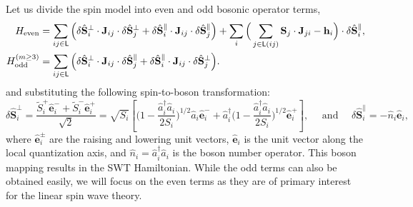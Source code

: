Let us divide the spin model into even and odd bosonic operator terms,
\begin{subequations}\label{eq: LSWT boson expansion even/odd}
    \begin{align}
        H_{\rm even} &= \sum_{ij\in\mathsf{L}} 
        \Big( \delta \hat{\mathbf{S}}_{i}^{\perp} \cdot \mathbf{J}_{ij} \cdot \delta \hat{\mathbf{S}}_{j}^{\perp} 
        + \delta \hat{\mathbf{S}}_{i}^{\parallel} \cdot \mathbf{J}_{ij} \cdot \delta \hat{\mathbf{S}}_{j}^{\parallel} \Big)
        + \sum_{i} \Big( \sum_{j \in \mathsf{L}(ij)} \mathbf{S}_{j} \cdot \mathbf{J}_{ji} - \mathbf{h}_{i} \Big) \cdot \delta \hat{\mathbf{S}}_{i}^{\parallel}, 
        \label{subeq: even bosonic terms in SWT} \\
        H_{\rm odd}^{(m \ge 3)} &= \sum_{ij\in\mathsf{L}} 
        \Big( \delta \hat{\mathbf{S}}_{i}^{\perp} \cdot \mathbf{J}_{ij} \cdot \delta \hat{\mathbf{S}}_{j}^{\parallel} 
        + \delta \hat{\mathbf{S}}_{i}^{\parallel} \cdot \mathbf{J}_{ij} \cdot \delta \hat{\mathbf{S}}_{j}^{\perp} \Big).
        \label{subeq: odd bosonic terms in SWT} 
    \end{align}
\end{subequations}
and substituting the following spin-to-boson transformation:
\begin{equation}
    \delta \hat{\mathbf{S}}_{i}^{\perp} = \frac{\widetilde{S}_{i}^{+} \hat{\mathbf{e}}^{-}_{i} + \widetilde{S}_{i}^{-} \hat{\mathbf{e}}^{+}_{i} }{\sqrt{2}} = \sqrt{S_{i}} \left[ \Big( 1 - \frac{\hat{a}^{\dagger}_{i}\hat{a}_{i}}{2S_{i}} \Big)^{1/2} \hat{a}_{i} \hat{\mathbf{e}}_{i}^{-} + \hat{a}_{i}^{\dagger} \Big( 1 - \frac{\hat{a}^{\dagger}_{i}\hat{a}_{i}}{2S_{i}} \Big)^{1/2} \hat{\mathbf{e}}_{i}^{+} \right], 
    \quad \text{ and } \quad
    \delta \hat{\mathbf{S}}^{\parallel}_{i} =  - \hat{n}_{i} \hat{\mathbf{e}}_{i},
\end{equation}
where $\hat{\mathbf{e}}_{i}^{\pm}$ are the raising and lowering unit vectors, $\hat{\mathbf{e}}_{i}$ is the unit vector along the local quantization axis, and $\hat{n}_{i} = \hat{a}^{\dagger}_{i}\hat{a}_{i}$ is the boson number operator.
This boson mapping results in the SWT Hamiltonian. 
While the odd terms can also be obtained easily, we will focus on the even terms as they are of primary interest for the linear spin wave theory.

